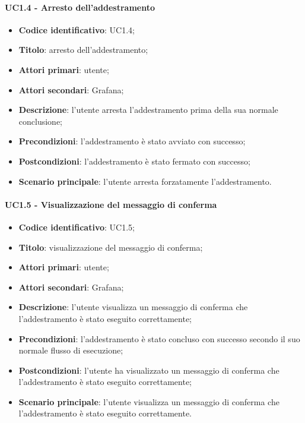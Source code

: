 \paragraph{UC1.4 - Arresto dell'addestramento}
\begin{itemize}
	\item \textbf{Codice identificativo}: UC1.4;
	\item \textbf{Titolo}: arresto dell'addestramento;
	\item \textbf{Attori primari}: utente;
	\item \textbf{Attori secondari}: Grafana\glo;
	\item \textbf{Descrizione}: l'utente arresta l'addestramento prima della sua normale conclusione;
	\item \textbf{Precondizioni}: l'addestramento è stato avviato con successo;
	\item \textbf{Postcondizioni}: l'addestramento è stato fermato con successo;
	\item \textbf{Scenario principale}: l'utente arresta forzatamente l'addestramento.
\end{itemize}

\paragraph{UC1.5 - Visualizzazione del messaggio di conferma}
\begin{itemize}
	\item \textbf{Codice identificativo}: UC1.5;
	\item \textbf{Titolo}: visualizzazione del messaggio di conferma;
	\item \textbf{Attori primari}: utente;
	\item \textbf{Attori secondari}: Grafana\glo;
	\item \textbf{Descrizione}: l'utente visualizza un messaggio di conferma che l'addestramento è stato eseguito correttamente;
	\item \textbf{Precondizioni}: l'addestramento è stato concluso con successo secondo il suo normale flusso di esecuzione;
	\item \textbf{Postcondizioni}: l'utente ha visualizzato un messaggio di conferma che l'addestramento è stato eseguito correttamente;
	\item \textbf{Scenario principale}: l'utente visualizza un messaggio di conferma che l'addestramento è stato eseguito correttamente.
\end{itemize}
